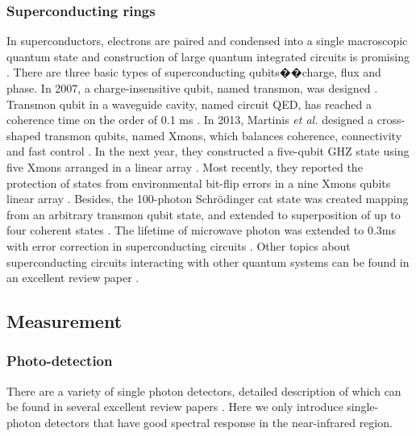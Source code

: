 \documentclass[aps, rmp, twocolumn, amsmath, amssymb, nofootinbib, superscriptaddress, longbibliography, floatfix, table-of-contents, eqsecnum]{revtex4-1}
\begin{document}
%
%

\subsubsection{Superconducting rings} 

In superconductors, electrons are paired and condensed into a single macroscopic quantum state and construction of large quantum integrated circuits is promising \cite{devoret2013superconducting}. There are three basic types of superconducting qubits��charge, flux and phase. In 2007, a charge-insensitive qubit, named transmon, was designed \cite{koch2007charge}. Transmon qubit in a waveguide cavity, named circuit QED, has reached a coherence time on the order of 0.1 ms \cite{paik2011observation, rigetti2012superconducting}. In 2013, Martinis \textit{et al.} designed a cross-shaped transmon qubits, named Xmons, which balances coherence, connectivity and fast control \cite{barends2013coherent}. In the next year, they constructed a five-qubit GHZ state using five Xmons arranged in a linear array \cite{barends2014superconducting}. Most recently, they reported the protection of states from environmental bit-flip errors in a nine Xmons qubits linear array \cite{kelly2015state}. Besides, the 100-photon Schr{\"o}dinger cat state was created mapping from an arbitrary transmon qubit state, and extended to superposition of up to four coherent states \cite{vlastakis2013deterministically}. The lifetime of microwave photon was extended to 0.3ms with error correction in superconducting circuits \cite{ofek2016extending}. Other topics about superconducting circuits interacting with other quantum systems can be found in an excellent review paper \cite{xiang2013hybrid}.

%
%

\subsection{Measurement} 

%
%

\subsubsection{Photo-detection} 

There are a variety of single photon detectors, detailed description of which can be found in several excellent review papers \cite{eisaman2011, hadfield2009}. Here we only introduce single-photon detectors that have good spectral response in the near-infrared region.
\end{document}
